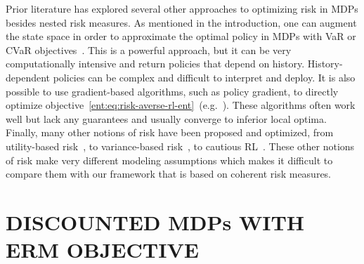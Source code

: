 \documentclass[twoside]{article}
\newcommand{\E}{\mathbb{E}}
\newcommand{\var}[2]{\operatorname{VaR}_{#1} \left[#2\right]}
\newcommand{\cvar}[2]{\operatorname{CVaR}_{#1} \left[#2\right]}
\newcommand{\evar}[2]{\operatorname{EVaR}_{#1} \left[#2\right]}
\theoremstyle{plain}
\theoremstyle{definition}
\theoremstyle{remark}
\renewcommand{\cite}[1]{\citep{#1}}
\begin{document}
Prior literature has explored several other approaches to optimizing risk in MDPs besides nested risk measures. As mentioned in the introduction, one can augment the state space in order to approximate the optimal policy in MDPs with VaR or CVaR objectives~\cite{Pflug2016,Pflug2016a,Bauerle2011,Li2022}. This is a powerful approach, but it can be very computationally intensive and return policies that depend on history. History-dependent policies can be complex and difficult to interpret and deploy. It is also possible to use gradient-based algorithms, such as policy gradient, to directly optimize objective~\eqref{ent:eq:risk-averse-rl-ent}~(e.g.~\citealt{Tamar2015,Tamar2012pgvariance}). These algorithms often work well but lack any guarantees and usually converge to inferior local optima. Finally, many other notions of risk have been proposed and optimized, from utility-based risk~\cite{Ben-Tal2007}, to variance-based risk~\cite{Prashanth13AC,Tamar2013,Prashanth16VC}, to cautious RL~\cite{Zhang2021a}. These other notions of risk make very different modeling assumptions which makes it difficult to compare them with our framework that is based on coherent risk measures.



\section{DISCOUNTED MDPs WITH ERM OBJECTIVE}
\label{ent:sec:rasr-erm}
\end{document}
